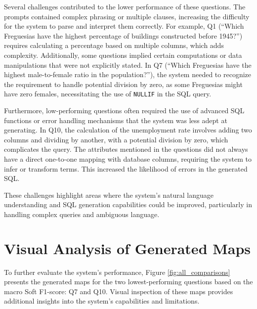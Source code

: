 Several challenges contributed to the lower performance of these questions. The prompts contained complex phrasing or multiple clauses, increasing the difficulty for the system to parse and interpret them correctly. For example, Q1 (“Which Freguesias have the highest percentage of buildings constructed before 1945?”) requires calculating a percentage based on multiple columns, which adds complexity. Additionally, some questions implied certain computations or data manipulations that were not explicitly stated. In Q7 (“Which Freguesias have the highest male-to-female ratio in the population?”), the system needed to recognize the requirement to handle potential division by zero, as some Freguesias might have zero females, necessitating the use of \texttt{NULLIF} in the SQL query.

Furthermore, low-performing questions often required the use of advanced SQL functions or error handling mechanisms that the system was less adept at generating. In Q10, the calculation of the unemployment rate involves adding two columns and dividing by another, with a potential division by zero, which complicates the query. The attributes mentioned in the questions did not always have a direct one-to-one mapping with database columns, requiring the system to infer or transform terms. This increased the likelihood of errors in the generated SQL.

These challenges highlight areas where the system's natural language understanding and SQL generation capabilities could be improved, particularly in handling complex queries and ambiguous language.

\section{Visual Analysis of Generated Maps}

To further evaluate the system's performance, Figure \ref{fig:all_comparisons} presents the generated maps for the two lowest-performing questions based on the macro Soft F1-score: Q7 and Q10. Visual inspection of these maps provides additional insights into the system's capabilities and limitations.

